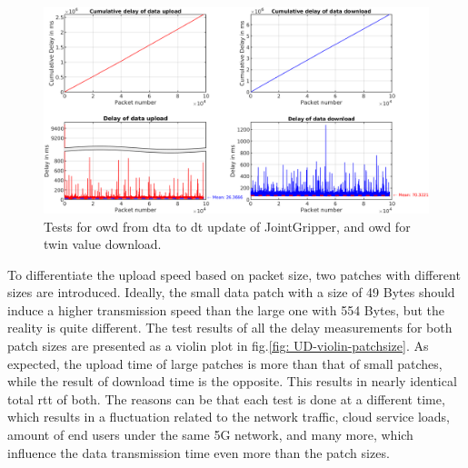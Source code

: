 \begin{figure}[htb]
    \centering
    \includegraphics[width=\textwidth]{figures/tests/DT/Delay_UploadDownload_JointGripper.png}
    \caption{Tests for \gls{owd} from \gls{dta} to \gls{dt} update of JointGripper, 
    and \gls{owd} for twin value download. \label{fig: UD-sep-JointGripper}}
\end{figure}


To differentiate the upload speed based on packet size, two patches with 
different sizes are introduced. Ideally, the small data patch with a size of 
49 Bytes should induce a higher transmission speed than the large one with 554 Bytes, 
but the reality is quite different. The test results of all the 
delay measurements for both patch sizes are presented as a violin plot in 
fig.\ref{fig: UD-violin-patchsize}. As expected, the upload time of large 
patches is more than that of small patches, while the result of download time is 
the opposite. This results in nearly identical total \gls{rtt} of both. 
The reasons can be that each test is done at a different time, which results in a 
fluctuation related to the network traffic, cloud service loads, amount of end users 
under the same 5G network, and many more, which influence the data transmission time 
even more than the patch sizes.

